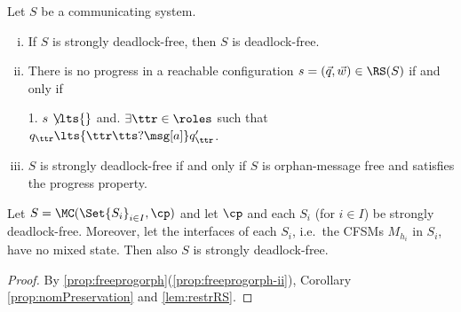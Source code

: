 \begin{proposition}
\label{prop:freeprogorph}
Let $S$ be a communicating system.
\begin{enumerate}[i)]
\item
If $S$ is strongly deadlock-free, then $S$ is deadlock-free.
\item
There is no progress in a reachable configuration $s= (\vec{q},\vec{w}) \in \RS(S)$ if and only if\\
\centerline{
 1. $s\, \not\!\!\lts{}$ and. $\exists \ttr\in\roles$ such that $q_\ttr \lts{\ttr\tts?\msg[a]} q'_\ttr$.
}
\item
\label{prop:freeprogorph-ii}
$S$ is strongly deadlock-free if and only if $S$ is orphan-message free and satisfies the progress property.
\end{enumerate}
\end{proposition}

\begin{corollary}%
\label{prop:dfPreservation}
Let $S = \MC(\Set{S_i}_{i\in I}, \cp)$ and let $\cp$ and each $S_i$ (for $i\in I$) be strongly deadlock-free.
 Moreover, let the interfaces of each $S_i$,
i.e.\ the CFSMs $M_{h_i}$ in $S_i$, have no mixed state.
Then also $S$  is strongly deadlock-free. 
\end{corollary}
\begin{proof}
By  \cref{prop:freeprogorph}(\ref{prop:freeprogorph-ii}),  Corollary \ref{prop:nomPreservation} and  \cref{lem:restrRS}.
\end{proof}

